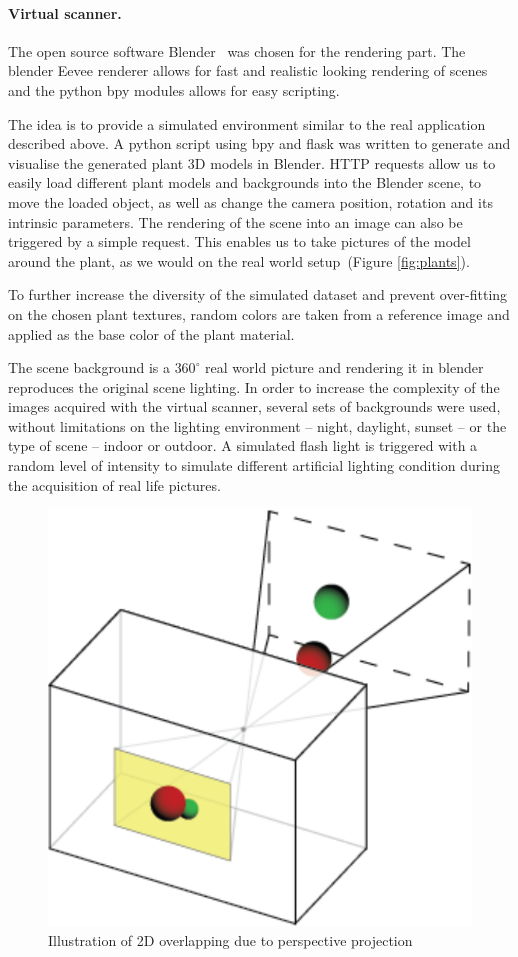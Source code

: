 \paragraph{Virtual scanner.} The open source software
Blender~\cite{blender} was chosen for the rendering part. The blender
Eevee renderer allows for fast and realistic looking rendering of
scenes and the python bpy modules allows for easy scripting.

The idea is to provide a simulated environment similar to
the real application described above. A python script using bpy and
flask was written to generate and visualise the generated plant 3D models in Blender. HTTP requests allow us to easily load different plant models and backgrounds into the Blender scene, to move the loaded object,
as well as change the camera position, rotation and its intrinsic parameters. The rendering of the scene into an image can also
be triggered by a simple request. This enables us to take pictures of the
model around the plant, as we would on the real world setup~(Figure
\ref{fig:plants}).

To further increase the diversity of the simulated dataset and prevent
over-fitting on the chosen plant textures, random colors are taken
from a reference image and applied as the base color of the plant material.

The scene background is a $360^{\circ}$ real world picture and rendering it in blender reproduces the
original scene lighting. In order to increase the complexity of the
images acquired with the virtual scanner, several sets of backgrounds were
used, without limitations on the lighting environment -- night, daylight,
sunset -- or the type of scene -- indoor or outdoor. A simulated flash light is
triggered with a random level of intensity to simulate different artificial lighting condition during the
acquisition of real life pictures.

\begin{figure}[h]
    \centering \includegraphics[width=0.3\linewidth]{figures/pinhole.png}
    \caption{Illustration of 2D overlapping due to perspective
    projection } \label{fig:pinhole}
\end{figure}

